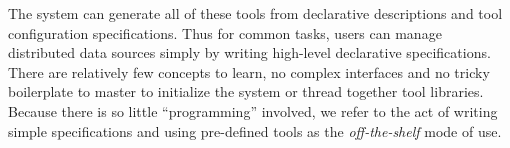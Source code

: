
The \padsd{} system can generate all of these tools from declarative descriptions
and tool configuration specifications.  Thus for common
tasks, users can manage distributed data sources simply by writing
high-level declarative specifications.  There
are relatively few concepts to learn, no complex interfaces and no
tricky boilerplate to master to initialize 
the system or thread together tool libraries.  Because there is
so little ``programming'' involved, we refer to the act 
of writing simple specifications
and using pre-defined tools as the {\em off-the-shelf} 
mode of use.  

